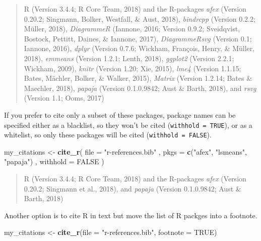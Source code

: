 \documentclass[man,floatsintext]{apa6}
\newenvironment{Shaded}{\begin{snugshade}}{\end{snugshade}}
\newcommand{\KeywordTok}[1]{\textcolor[rgb]{0.13,0.29,0.53}{\textbf{#1}}}
\newcommand{\DataTypeTok}[1]{\textcolor[rgb]{0.13,0.29,0.53}{#1}}
\newcommand{\StringTok}[1]{\textcolor[rgb]{0.31,0.60,0.02}{#1}}
\newcommand{\OtherTok}[1]{\textcolor[rgb]{0.56,0.35,0.01}{#1}}
\newcommand{\NormalTok}[1]{#1}
\theoremstyle{definition}
\theoremstyle{definition}
\theoremstyle{definition}
\theoremstyle{remark}
\begin{document}
\begin{quote}
R (Version 3.4.4; R Core Team, 2018) and the R-packages \emph{afex}
(Version 0.20.2; Singmann, Bolker, Westfall, \& Aust, 2018),
\emph{bindrcpp} (Version 0.2.2; Müller, 2018), \emph{DiagrammeR}
(Iannone, 2016; Version 0.9.2; Sveidqvist, Bostock, Pettitt, Daines, \&
Iannone, 2017), \emph{DiagrammeRsvg} (Version 0.1; Iannone, 2016),
\emph{dplyr} (Version 0.7.6; Wickham, François, Henry, \& Müller, 2018),
\emph{emmeans} (Version 1.2.1; Lenth, 2018), \emph{ggplot2} (Version
2.2.1; Wickham, 2009), \emph{knitr} (Version 1.20; Xie, 2015),
\emph{lme4} (Version 1.1.15; Bates, Mächler, Bolker, \& Walker, 2015),
\emph{Matrix} (Version 1.2.14; Bates \& Maechler, 2018), \emph{papaja}
(Version 0.1.0.9842; Aust \& Barth, 2018), and \emph{rsvg} (Version 1.1;
Ooms, 2017)
\end{quote}

If you prefer to cite only a subset of these packages, package names can
be specified either as a blacklist, so they won't be cited
(\texttt{withhold\ =\ TRUE}), or as a whitelist, so only these packages
will be cited (\texttt{withhold\ =\ FALSE}).

\begin{Shaded}
\begin{Highlighting}[]
\NormalTok{my_citations <-}\StringTok{ }\KeywordTok{cite_r}\NormalTok{(}
  \DataTypeTok{file =} \StringTok{"r-references.bib"}
\NormalTok{  , }\DataTypeTok{pkgs =} \KeywordTok{c}\NormalTok{(}\StringTok{"afex"}\NormalTok{, }\StringTok{"lsmeans"}\NormalTok{, }\StringTok{"papaja"}\NormalTok{)}
\NormalTok{  , }\DataTypeTok{withhold =} \OtherTok{FALSE}
\NormalTok{)}
\end{Highlighting}
\end{Shaded}

\begin{quote}
R (Version 3.4.4; R Core Team, 2018) and the R-packages \emph{afex}
(Version 0.20.2; Singmann et al., 2018), and \emph{papaja} (Version
0.1.0.9842; Aust \& Barth, 2018)
\end{quote}

Another option is to cite R in text but move the list of R packges into
a footnote.

\begin{Shaded}
\begin{Highlighting}[]
\NormalTok{my_citations <-}\StringTok{ }\KeywordTok{cite_r}\NormalTok{(}\DataTypeTok{file =} \StringTok{"r-references.bib"}\NormalTok{, }\DataTypeTok{footnote =} \OtherTok{TRUE}\NormalTok{)}
\end{Highlighting}
\end{Shaded}
\end{document}
